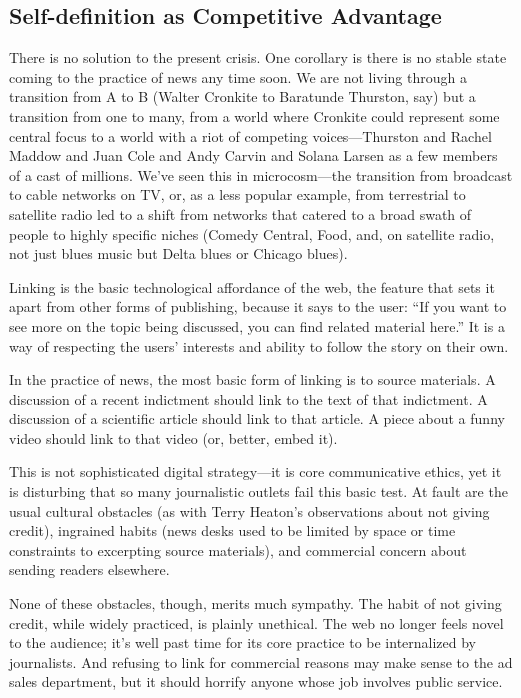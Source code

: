 \subsection{Self-definition as Competitive Advantage}

There is no solution to the present crisis. One corollary is there is no stable state
coming to the practice of news any time soon. We are not living through a transition
from A to B (Walter Cronkite to Baratunde Thurston, say) but a transition from
one to many, from a world where Cronkite could represent some central focus to a
world with a riot of competing voices—Thurston and Rachel Maddow and Juan
Cole and Andy Carvin and Solana Larsen as a few members of a cast of millions.
We’ve seen this in microcosm—the transition from broadcast to cable networks
on TV, or, as a less popular example, from terrestrial to satellite radio led to a shift
from networks that catered to a broad swath of people to highly specific niches
(Comedy Central, Food, and, on satellite radio, not just blues music but Delta
blues or Chicago blues).

Linking is the basic technological affordance of the web, the feature that
sets it apart from other forms of publishing, because it says to the user:
``If you want to see more on the topic being discussed, you can find
related material here.'' It is a way of respecting the users’ interests and
ability to follow the story on their own.

In the practice of news, the most basic form of linking is to source
materials. A discussion of a recent indictment should link to the text of
that indictment. A discussion of a scientific article should link to that
article. A piece about a funny video should link to that video (or, better,
embed it).

This is not sophisticated digital strategy—it is core communicative ethics,
yet it is disturbing that so many journalistic outlets fail this basic test.
At fault are the usual cultural obstacles (as with Terry Heaton’s observations
about not giving credit), ingrained habits (news desks used to be
limited by space or time constraints to excerpting source materials), and
commercial concern about sending readers elsewhere.

None of these obstacles, though, merits much sympathy. The habit
of not giving credit, while widely practiced, is plainly unethical. The
web no longer feels novel to the audience; it’s well past time for its
core practice to be internalized by journalists. And refusing to link for
commercial reasons may make sense to the ad sales department, but it
should horrify anyone whose job involves public service.

